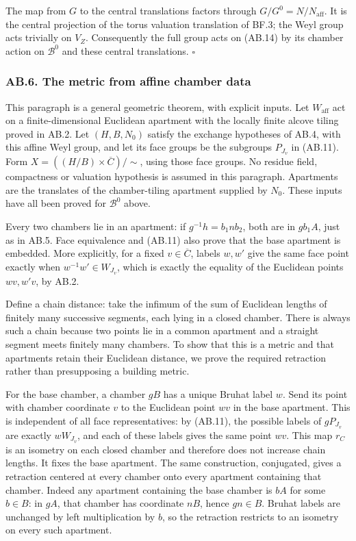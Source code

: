 \documentclass[
  11pt,
]{article}
\begin{document}
The map from \(G\) to the central translations factors through
\(G/G^0=N/N_{\mathrm{aff}}\). It is the central projection of the torus
valuation translation of BF.3; the Weyl group acts trivially on \(V_Z\).
Consequently the full group acts on (AB.14) by its chamber action on
\(\mathcal B^0\) and these central translations. \(\square\)

\subsubsection{AB.6. The metric from affine chamber
data}\label{ab.6.-the-metric-from-affine-chamber-data}

This paragraph is a general geometric theorem, with explicit inputs. Let
\(W_{\mathrm{aff}}\) act on a finite-dimensional Euclidean apartment
with the locally finite alcove tiling proved in AB.2. Let \((H,B,N_0)\)
satisfy the exchange hypotheses of AB.4, with this affine Weyl group,
and let its face groups be the subgroups \(P_{J_v}\) in (AB.11). Form
\(X=((H/B)\times\overline C)/\sim\), using those face groups. No residue
field, compactness or valuation hypothesis is assumed in this paragraph.
Apartments are the translates of the chamber-tiling apartment supplied
by \(N_0\). These inputs have all been proved for \(\mathcal B^0\)
above.

Every two chambers lie in an apartment: if \(g^{-1}h=b_1nb_2\), both are
in \(gb_1A\), just as in AB.5. Face equivalence and (AB.11) also prove
that the base apartment is embedded. More explicitly, for a fixed
\(v\in\overline C\), labels \(w,w'\) give the same face point exactly
when \(w^{-1}w'\in W_{J_v}\), which is exactly the equality of the
Euclidean points \(wv,w'v\), by AB.2.

Define a chain distance: take the infimum of the sum of Euclidean
lengths of finitely many successive segments, each lying in a closed
chamber. There is always such a chain because two points lie in a common
apartment and a straight segment meets finitely many chambers. To show
that this is a metric and that apartments retain their Euclidean
distance, we prove the required retraction rather than presupposing a
building metric.

For the base chamber, a chamber \(gB\) has a unique Bruhat label \(w\).
Send its point with chamber coordinate \(v\) to the Euclidean point
\(wv\) in the base apartment. This is independent of all face
representatives: by (AB.11), the possible labels of \(gP_{J_v}\) are
exactly \(wW_{J_v}\), and each of these labels gives the same point
\(wv\). This map \(r_C\) is an isometry on each closed chamber and
therefore does not increase chain lengths. It fixes the base apartment.
The same construction, conjugated, gives a retraction centered at every
chamber onto every apartment containing that chamber. Indeed any
apartment containing the base chamber is \(bA\) for some \(b\in B\): in
\(gA\), that chamber has coordinate \(nB\), hence \(gn\in B\). Bruhat
labels are unchanged by left multiplication by \(b\), so the retraction
restricts to an isometry on every such apartment.
\end{document}
